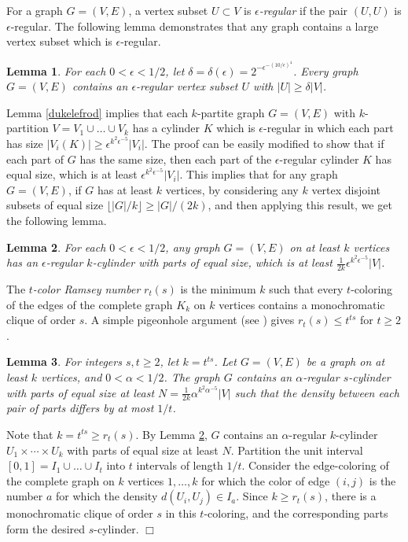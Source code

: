 \documentclass[11pt]{article}
\newtheorem{lemma}{Lemma}[section]
\newenvironment{proof}
      {\medskip\noindent{\bf Proof:}\hspace{1mm}}
      {\hfill$\Box$\medskip}
\begin{document}
For a graph $G=(V,E)$, a vertex subset $U \subset V$ is {\it
$\epsilon$-regular} if the pair $(U,U)$ is $\epsilon$-regular. The following
lemma demonstrates that any graph contains a large vertex subset which is
$\epsilon$-regular.

\begin{lemma}\label{oneepsilonregularsubset}
For each $0<\epsilon<1/2$, let
$\delta=\delta(\epsilon)=2^{-\epsilon^{-(10/\epsilon)^{4}}}$. Every graph
$G=(V,E)$ contains an $\epsilon$-regular vertex subset $U$ with $|U| \geq
\delta |V|$.
\end{lemma}

Lemma \ref{dukelefrod} implies that each $k$-partite graph $G=(V,E)$ with
$k$-partition $V=V_1 \cup \ldots \cup V_k$ has a cylinder $K$ which is
$\epsilon$-regular in which each part has size $|V_i(K)| \geq
\epsilon^{k^2\epsilon^{-5}}|V_i|$. The proof can be easily modified to show
that if each part of $G$ has the same size, then each
part of the $\epsilon$-regular cylinder $K$ has equal size, which is at least
$\epsilon^{k^2\epsilon^{-5}}|V_i|$. This implies that for any graph $G=(V,E)$,
if $G$ has at least $k$ vertices, by considering any $k$ vertex disjoint
subsets of equal size $\lfloor |G|/k \rfloor \geq |G|/(2k)$, and then applying
this result, we get the following lemma.

\begin{lemma}\label{onecyl} For each $0<\epsilon<1/2$, any graph $G=(V,E)$ on at least $k$ vertices has an
$\epsilon$-regular $k$-cylinder with parts of equal size, which is at least
$\frac{1}{2k}\epsilon^{k^2\epsilon^{-5}}|V|$.
\end{lemma}

The {\it $t$-color Ramsey number} $r_t(s)$ is the minimum $k$ such that every
$t$-coloring of the edges of the complete graph $K_k$ on $k$ vertices contains
a monochromatic clique of order $s$. A simple pigeonhole argument (see
\cite{GRS}) gives $r_t(s) \leq t^{ts}$ for $t \geq 2$.

\begin{lemma}\label{steps} For integers $s,t \geq 2$, let $k=t^{ts}$. Let
$G=(V,E)$ be a graph on at least $k$ vertices, and $0<\alpha<1/2$.
The graph $G$ contains an $\alpha$-regular $s$-cylinder with parts of equal
size at least $N=\frac{1}{2k}\alpha^{k^2\alpha^{-5}}|V|$ such that the density
between each pair of parts differs by at most $1/t$.
\end{lemma}
\begin{proof}
Note that $k=t^{ts} \geq r_t(s)$. By Lemma \ref{onecyl}, $G$ contains an
$\alpha$-regular $k$-cylinder $U_1 \times \cdots \times U_k$ with parts of equal size at least $N$. Partition
the unit interval  $[0,1]=I_1 \cup \ldots \cup I_t$ into $t$ intervals of
length $1/t$. Consider the edge-coloring of the complete graph on $k$ vertices $1,\ldots,k$ for
which the color of edge $(i,j)$ is the number $a$ for which the density
$d(U_i,U_j) \in I_a$. Since $k\geq r_t(s)$, there is a monochromatic clique of
order $s$ in this $t$-coloring, and the corresponding parts form the desired
$s$-cylinder.
\end{proof}
\end{document}
